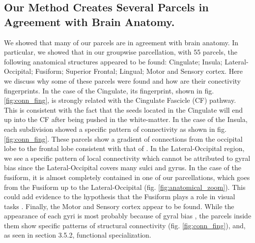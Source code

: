 \subsection{Our Method Creates Several Parcels in Agreement with Brain Anatomy.}
%
We showed that many of our parcels are in agreement with brain anatomy. 
In particular, we showed that in our groupwise parcellation, with 55 parcels,
the following anatomical structures appeared to be found: Cingulate; Insula;
Lateral-Occipital; Fusiform; Superior Frontal; Lingual; Motor and Sensory cortex.
Here we discuss why some of these parcels were found and how are their 
conectivity fingerprints.
In the case of the Cingulate, its fingerprint, shown in fig. \ref{fig:conn_fing}, is
strongly related with the Cingulate Fascicle (CF) pathway. This
is consistent with the 
fact that the seeds located in the Cingulate will end up into the CF after being 
pushed in the white-matter. In the case of the Insula, each subdivision
showed a specific pattern of connectivity as shown in fig. \ref{fig:conn_fing}. 
These parcels show a gradient of connections from the occipital lobe to the frontal
lobe consistent with that of \citet{Ghaziri2015}. In the
Lateral-Occipital region, we see a specific pattern of local connectivity which
cannot be attributed to gyral bias since the Lateral-Occipital covers many sulci
and gyrus. In the case of the fusiform, it is almost completely contained in one
of our parcellations, which goes from the Fusiform up to the Lateral-Occipital
(fig. \ref{fig:anatomical_zoom}). 
This could add evidence to the hypothesis that the Fusiform plays a role in visual
tasks \citep{Kanwisher2006, Yeatman2014}. Finally, the Motor and Sensory cortex appear to be
found. While the
appearance of each gyri is most probably because of gyral bias \citep{VanEssen2014},
the parcels inside them show specific patterns of structural connectivity (fig.
\ref{fig:conn_fing}), and, as seen in section 3.5.2, functional specialization.

